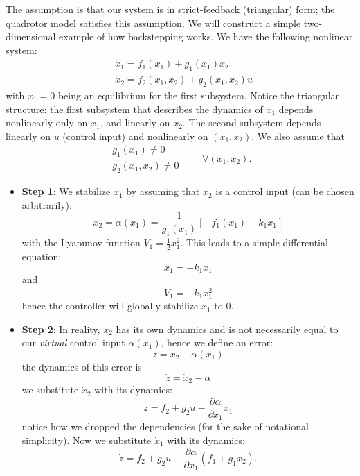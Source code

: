 \documentclass[10pt, a4paper]{report}
\begin{document}
The assumption is that our system is in strict-feedback (triangular) form; the quadrotor model satisfies this assumption. We will construct a simple two-dimensional example of how backstepping works. We have the following nonlinear system:\begin{align}
    &\dot x_1=f_1(x_1)+g_1(x_1)x_2\\ 
    &\dot x_2=f_2(x_1,x_2)+g_2(x_1,x_2)u
\end{align}
with $x_1=0$ being an equilibrium for the first subsystem. Notice the triangular structure: the first subsystem that describes the dynamics of $x_1$ depends nonlinearly only on $x_1$, and linearly on $x_2$. The second subsystem depends linearly on $u$ (control input) and nonlinearly on $(x_1,x_2)$. We also assume that
\begin{equation}
    \begin{matrix}
        g_1(x_1)\ne 0\\ 
        g_2(x_1,x_2)\ne 0
    \end{matrix}\quad\quad\forall(x_1,x_2).
\end{equation}
\begin{itemize}
    \item \textbf{Step 1}: We stabilize $x_1$ by assuming that $x_2$ is a control input (can be chosen arbitrarily):\begin{equation}
        x_2=\alpha(x_1)=\frac{1}{g_1(x_1)}[-f_1(x_1)-k_1x_1]
    \end{equation}
    with the Lyapunov function $V_1=\frac{1}{2}x_1^2$. This leads to a simple differential equation:\begin{equation}
        \dot x_1=-k_1x_1
    \end{equation}
    and\begin{equation}
        \dot V_1=-k_1x_1^2
    \end{equation}
    hence the controller will globally stabilize $x_1$ to $0$.
    \item \textbf{Step 2}: In reality, $x_2$ has its own dynamics and is not necessarily equal to our \textit{virtual} control input $\alpha(x_1)$, hence we define an error:\begin{equation}
        z=x_2-\alpha(x_1)
    \end{equation}
    the dynamics of this error is\begin{equation}
        \dot z=\dot x_2-\dot \alpha
    \end{equation}
    we substitute $\dot x_2$ with its dynamics:\begin{equation}
         \dot z=f_2+g_2u-\frac{\partial\alpha}{\partial x_1}\dot x_1
    \end{equation}
    notice how we dropped the dependencies (for the sake of notational simplicity). Now we substitute $\dot x_1$ with its dynamics:\begin{equation}\label{dot_z}
         \dot z=f_2+g_2u-\frac{\partial\alpha}{\partial x_1}(f_1+g_1x_2).
    \end{equation}
\end{itemize}
\end{document}
